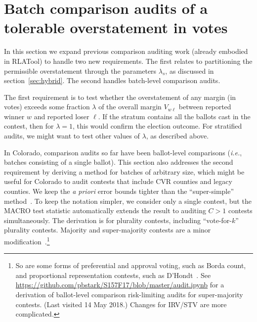\section{Batch comparison audits of a tolerable overstatement in votes}
\label{sec:comparisonError}

In this section we expand previous comparison auditing work (already embodied in RLATool) to handle two new requirements.  
The first relates to partitioning the permissible overstatement
through the parameters $\lambda_s$, as discussed in section~\ref{sec:hybrid}. 
The second handles batch-level comparison audits.

The first requirement is to test whether the overstatement of any margin
(in votes) exceeds some fraction $\lambda$ of the overall margin $V_{w\ell}$ between
reported winner $w$ and reported loser $\ell$.
If the stratum contains all the ballots cast in the contest, then for $\lambda = 1$, this 
would confirm the election outcome.
For stratified audits, we might want to test other values of $\lambda$, as described above.

In Colorado, comparison audits so far have been ballot-level comparisons
(\emph{i.e.}, batches consisting of a single ballot). 
This section also addresses the second requirement by deriving a method for batches of arbitrary size, which might be useful
for Colorado to audit contests that include CVR counties and legacy counties.
We keep the \emph{a priori} error bounds tighter than the ``super-simple'' 
method~\cite{stark10d}.
To keep the notation simpler, we consider only a single contest, but the 
MACRO test statistic \cite{stark09c,stark10d} automatically extends the result to 
auditing $C>1$ contests simultaneously.
The derivation is for plurality contests, including ``vote-for-$k$'' plurality contests.
Majority and super-majority contests are a minor 
modification~\cite{stark08a}.\footnote{%
  So are some forms of preferential and approval voting, such as Borda count, and
  proportional representation contests, such as D'Hondt~\cite{starkTeague14}.
  See \url{https://github.com/pbstark/S157F17/blob/master/audit.ipynb} for a derivation
  of ballot-level comparison risk-limiting audits for super-majority contests. (Last visited 14 May 2018.)
  Changes for IRV/STV are more complicated.
}

